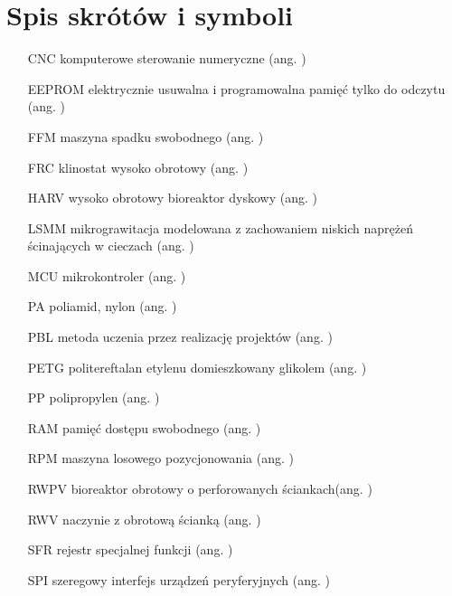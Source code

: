 \chapter*{Spis skrótów i symboli}

\begin{itemize}
	
	\item[CNC] komputerowe sterowanie numeryczne ({ang. })
	\item[EEPROM] elektrycznie usuwalna i programowalna pamięć tylko do odczytu ({ang. })
	\item[FFM] maszyna spadku swobodnego ({ang. })
	\item[FRC] klinostat wysoko obrotowy  ({ang. })
	\item[HARV] wysoko obrotowy bioreaktor dyskowy   ({ang. })
	\item[LSMM] mikrograwitacja modelowana z zachowaniem niskich naprężeń ścinających w cieczach  (ang. )
	\item[MCU] mikrokontroler (ang. )
	\item[PA] poliamid, nylon ({ang. })
	\item[PBL] metoda uczenia przez realizację projektów   ({ang. })
	\item[PETG] politereftalan etylenu domieszkowany glikolem  ({ang. })
	\item[PP] polipropylen ({ang. })
	\item[RAM] pamięć dostępu swobodnego ({ang. })
	\item[RPM] maszyna losowego pozycjonowania ({ang. })
	\item[RWPV] bioreaktor obrotowy o perforowanych ściankach({ang. })
	\item[RWV] naczynie z obrotową ścianką  ({ang. })
	\item[SFR] rejestr specjalnej funkcji ({ang. })
	\item[SPI] szeregowy interfejs urządzeń peryferyjnych ({ang. })

\end{itemize}
